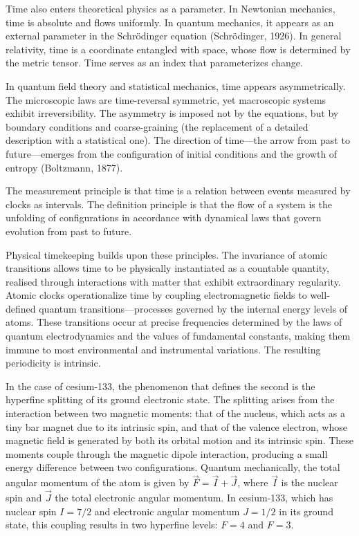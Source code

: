 Time also enters theoretical physics as a parameter. In Newtonian mechanics, time is absolute and flows uniformly. In quantum mechanics, it appears as an external parameter in the Schrödinger equation (Schrödinger, 1926). In general relativity, time is a coordinate entangled with space, whose flow is determined by the metric tensor. Time serves as an index that parameterizes change.

In quantum field theory and statistical mechanics, time appears asymmetrically. The microscopic laws are time-reversal symmetric, yet macroscopic systems exhibit irreversibility. The asymmetry is imposed not by the equations, but by boundary conditions and coarse-graining (the replacement of a detailed description with a statistical one). The direction of time—the arrow from past to future—emerges from the configuration of initial conditions and the growth of entropy (Boltzmann, 1877).

The measurement principle is that time is a relation between events measured by clocks as intervals. The definition principle is that the flow of a system is the unfolding of configurations in accordance with dynamical laws that govern evolution from past to future. 

Physical timekeeping builds upon these principles. The invariance of atomic transitions allows time to be physically instantiated as a countable quantity, realised through interactions with matter that exhibit extraordinary regularity. Atomic clocks operationalize time by coupling electromagnetic fields to well-defined quantum transitions—processes governed by the internal energy levels of atoms. These transitions occur at precise frequencies determined by the laws of quantum electrodynamics and the values of fundamental constants, making them immune to most environmental and instrumental variations. The resulting periodicity is intrinsic.

In the case of cesium-133, the phenomenon that defines the second is the hyperfine splitting of its ground electronic state. The splitting arises from the interaction between two magnetic moments: that of the nucleus, which acts as a tiny bar magnet due to its intrinsic spin, and that of the valence electron, whose magnetic field is generated by both its orbital motion and its intrinsic spin. These moments couple through the magnetic dipole interaction, producing a small energy difference between two configurations. Quantum mechanically, the total angular momentum of the atom is given by $\vec{F} = \vec{I} + \vec{J}$, where $\vec{I}$ is the nuclear spin and $\vec{J}$ the total electronic angular momentum. In cesium-133, which has nuclear spin $I = 7/2$ and electronic angular momentum $J = 1/2$ in its ground state, this coupling results in two hyperfine levels: $F = 4$ and $F = 3$.

